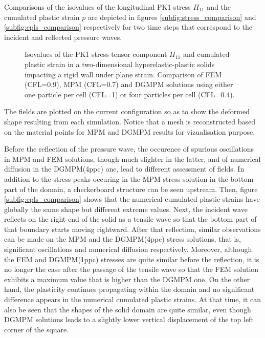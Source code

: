 Comparisons of the isovalues of the longitudinal PK1 stress $\Pi_{11}$ and the cumulated plastic strain $p$ are depicted in figures \ref{subfig:stress_comparison} and \ref{subfig:epls_comparison} respectively for two time steps that correspond to the incident and reflected pressure waves.
\begin{figure}[ht]
  \centering
  \qquad
  \caption{Isovalues of the PK1 stress tensor component $\Pi_{11}$ and cumulated plastic strain in a two-dimensional hyperelastic-plastic solids impacting a rigid wall under plane strain. Comparison of FEM (CFL=0.9), MPM (CFL=0.7) and DGMPM solutions using either one particle per cell (CFL=1) or four particles per cell (CFL=0.4).}
  \label{fig:PS_taylor}
\end{figure}
The fields are plotted on the current configuration so as to show the deformed shape resulting from each simulation.
Notice that a mesh is reconstructed based on the material points for MPM and DGMPM results for vizualisation purpose.

Before the reflection of the pressure wave, the occurence of spurious oscillations in MPM and FEM solutions, though much slighter in the latter, and of numerical diffusion in the DGMPM(4ppc) one, lead to different assessment of fields.
In addition to the stress peaks occuring in the MPM stress solution in the bottom part of the domain, a checkerboard structure can be seen upstream.
Then, figure \ref{subfig:epls_comparison} shows that the numerical cumulated plastic strains have globally the same shape but different extreme values.
%
Next, the incident wave reflects on the right end of the solid as a tensile wave so that the bottom part of that boundary starts moving rightward.
After that reflection, similar observations can be made on the MPM and the DGMPM(4ppc) stress solutions, that is, significant oscillations and numerical diffusion respectively.
Moreover, although the FEM and DGMPM(1ppc) stresses are quite similar before the reflection, it is no longer the case after the passage of the tensile wave so that the FEM solution exhibits a maximum value that is higher than the DGMPM one.
On the other hand, the plasticity continues propagating within the domain and no significant difference appears in the numerical cumulated plastic strains.
At that time, it can also be seen that the shapes of the solid domain are quite similar, even though DGMPM solutions leads to a slightly lower vertical displacement of the top left corner of the square.

